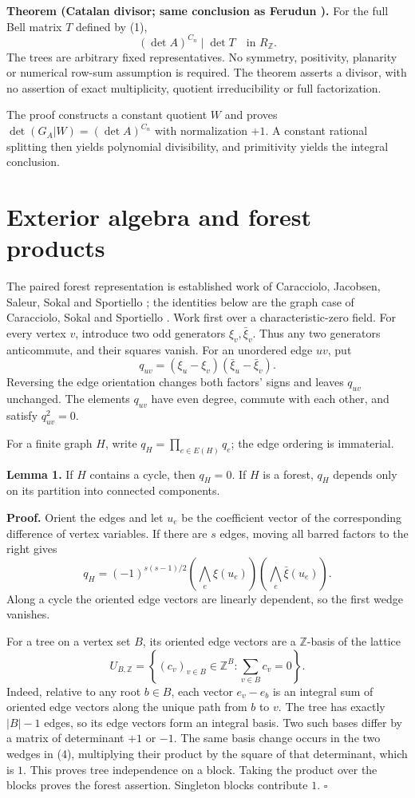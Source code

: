 \documentclass[11pt]{article}
\begin{document}
\noindent\textbf{Theorem (Catalan divisor; same conclusion as Ferudun \cite[Theorem 1.2]{Ferudun}).}
For the full Bell matrix $T$ defined by (1),
\[
(\det A)^{C_n}\mid\det T\quad\text{in }R_{\mathbb Z}.\tag{2}
\]
The trees are arbitrary fixed representatives. No symmetry, positivity, planarity or numerical row-sum assumption is required. The theorem asserts a divisor, with no assertion of exact multiplicity, quotient irreducibility or full factorization.

The proof constructs a constant quotient $W$ and proves $\det(G_A|W)=(\det A)^{C_n}$ with normalization $+1$. A constant rational splitting then yields polynomial divisibility, and primitivity yields the integral conclusion.

\section{Exterior algebra and forest products}\label{exterior-algebra-and-forest-products}

The paired forest representation is established work of Caracciolo, Jacobsen, Saleur, Sokal and Sportiello \cite{CJSSS}; the identities below are the graph case of Caracciolo, Sokal and Sportiello \cite[Section 4]{CSS}. Work first over a characteristic-zero field. For every vertex \(v\), introduce two odd generators \(\xi_v,\bar\xi_v\). Thus any two generators anticommute, and their squares vanish. For an unordered edge \(uv\), put \[
q_{uv}=(\xi_u-\xi_v)(\bar\xi_u-\bar\xi_v).
\tag{3}
\] Reversing the edge orientation changes both factors' signs and leaves \(q_{uv}\) unchanged. The elements \(q_{uv}\) have even degree, commute with each other, and satisfy \(q_{uv}^2=0\).

For a finite graph \(H\), write \(q_H=\prod_{e\in E(H)}q_e\); the edge ordering is immaterial.

\textbf{Lemma 1.} If \(H\) contains a cycle, then \(q_H=0\). If \(H\) is a forest, \(q_H\) depends only on its partition into connected components.

\textbf{Proof.} Orient the edges and let \(u_e\) be the coefficient vector of the corresponding difference of vertex variables. If there are \(s\) edges, moving all barred factors to the right gives \[
q_H=(-1)^{s(s-1)/2}
 \left(\bigwedge_e\xi(u_e)\right)
 \left(\bigwedge_e\bar\xi(u_e)\right).
\tag{4}
\] Along a cycle the oriented edge vectors are linearly dependent, so the first wedge vanishes.

For a tree on a vertex set \(B\), its oriented edge vectors are a \(\mathbb Z\)-basis of the lattice \[
U_{B,\mathbb Z}=
\left\{(c_v)_{v\in B}\in\mathbb Z^B:\sum_{v\in B}c_v=0\right\}.
\] Indeed, relative to any root \(b\in B\), each vector \(e_v-e_b\) is an integral sum of oriented edge vectors along the unique path from \(b\) to \(v\). The tree has exactly \(|B|-1\) edges, so its edge vectors form an integral basis. Two such bases differ by a matrix of determinant \(+1\) or \(-1\). The same basis change occurs in the two wedges in (4), multiplying their product by the square of that determinant, which is \(1\). This proves tree independence on a block. Taking the product over the blocks proves the forest assertion. Singleton blocks contribute \(1\). \(\square\)
\end{document}
